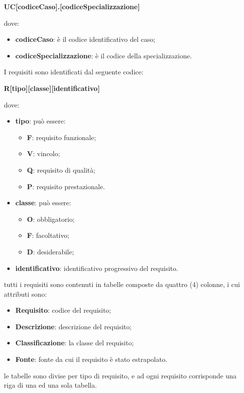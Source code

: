 	    \centerline{\textbf{UC[codiceCaso].[codiceSpecializzazione]}}
	    dove:
	    \begin{itemize}
	        \item \textbf{codiceCaso}: è il codice identificativo del caso;
	        \item \textbf{codiceSpecializzazione}: è il codice della specializzazione.
	    \end{itemize}
	    I requisiti sono identificati dal seguente codice:\\
	    \centerline{\textbf{R[tipo][classe][identificativo]}}
	    dove:
	    \begin{itemize}
	        \item \textbf{tipo}: può essere:
	        \begin{itemize}
	            \item \textbf{F}: requisito funzionale;
	            \item \textbf{V}: vincolo;
	            \item \textbf{Q}: requisito di qualità;
	            \item \textbf{P}: requisito prestazionale. 
	        \end{itemize}
	        \item \textbf{classe}: può essere:
	        \begin{itemize}
	            \item \textbf{O}: obbligatorio;
	            \item \textbf{F}: facoltativo;
	            \item \textbf{D}: desiderabile;
	        \end{itemize}
	        \item \textbf{identificativo}: identificativo progressivo del requisito.
	    \end{itemize}
	    tutti i requisiti sono contenuti in tabelle composte da quattro (4) colonne, i cui attributi sono:
	    \begin{itemize}
	        \item \textbf{Requisito}: codice del requisito;
	        \item \textbf{Descrizione}: descrizione del requisito;
	        \item \textbf{Classificazione}: la classe del requisito;
	        \item \textbf{Fonte}: fonte da cui il requisito è stato estrapolato.
	    \end{itemize}
	    le tabelle sono divise per tipo di requisito, e ad ogni requisito corrisponde una riga di una ed una sola tabella.
